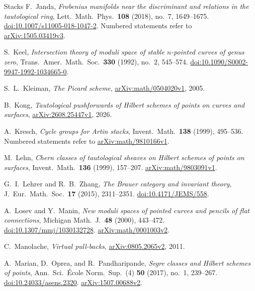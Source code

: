 \begin{thebibliography}{Stacks}
F.~Janda,
\emph{Frobenius manifolds near the discriminant and relations in the tautological ring},
Lett.\ Math.\ Phys.\ \textbf{108} (2018), no.~7, 1649--1675.
\href{https://doi.org/10.1007/s11005-018-1047-2}{doi:10.1007/s11005-018-1047-2}.
Numbered statements refer to
\href{https://arxiv.org/abs/1505.03419v3}{arXiv:1505.03419v3}.

S.~Keel,
\emph{Intersection theory of moduli space of stable $n$-pointed curves of genus zero},
Trans.\ Amer.\ Math.\ Soc.\ \textbf{330} (1992), no.~2, 545--574.
\href{https://doi.org/10.1090/S0002-9947-1992-1034665-0}{doi:10.1090/S0002-9947-1992-1034665-0}.

S.~L.~Kleiman,
\emph{The Picard scheme},
\href{https://arxiv.org/abs/math/0504020v1}{arXiv:math/0504020v1}, 2005.

B.~Kong,
\emph{Tautological pushforwards of Hilbert schemes of points on curves and surfaces},
\href{https://arxiv.org/abs/2608.25447v1}{arXiv:2608.25447v1}, 2026.

A.~Kresch,
\emph{Cycle groups for Artin stacks},
Invent.\ Math.\ \textbf{138} (1999), 495--536.
Numbered statements refer to
\href{https://arxiv.org/abs/math/9810166v1}{arXiv:math/9810166v1}.

M.~Lehn,
\emph{Chern classes of tautological sheaves on Hilbert schemes of points on surfaces},
Invent.\ Math.\ \textbf{136} (1999), 157--207.
\href{https://arxiv.org/abs/math/9803091v1}{arXiv:math/9803091v1}.

G.~I.~Lehrer and R.~B.~Zhang,
\emph{The Brauer category and invariant theory},
J.\ Eur.\ Math.\ Soc.\ \textbf{17} (2015), 2311--2351.
\href{https://doi.org/10.4171/JEMS/558}{doi:10.4171/JEMS/558}.

A.~Losev and Y.~Manin,
\emph{New moduli spaces of pointed curves and pencils of flat connections},
Michigan Math.\ J.\ \textbf{48} (2000), 443--472.
\href{https://doi.org/10.1307/mmj/1030132728}{doi:10.1307/mmj/1030132728}.
\href{https://arxiv.org/abs/math/0001003v2}{arXiv:math/0001003v2}.

C.~Manolache,
\emph{Virtual pull-backs},
\href{https://arxiv.org/abs/0805.2065v2}{arXiv:0805.2065v2}, 2011.

A.~Marian, D.~Oprea, and R.~Pandharipande,
\emph{Segre classes and Hilbert schemes of points},
Ann.\ Sci.\ \'Ecole Norm.\ Sup.\ (4) \textbf{50} (2017), no.~1, 239--267.
\href{https://doi.org/10.24033/asens.2320}{doi:10.24033/asens.2320}.
\href{https://arxiv.org/abs/1507.00688v2}{arXiv:1507.00688v2}.


\end{thebibliography}
